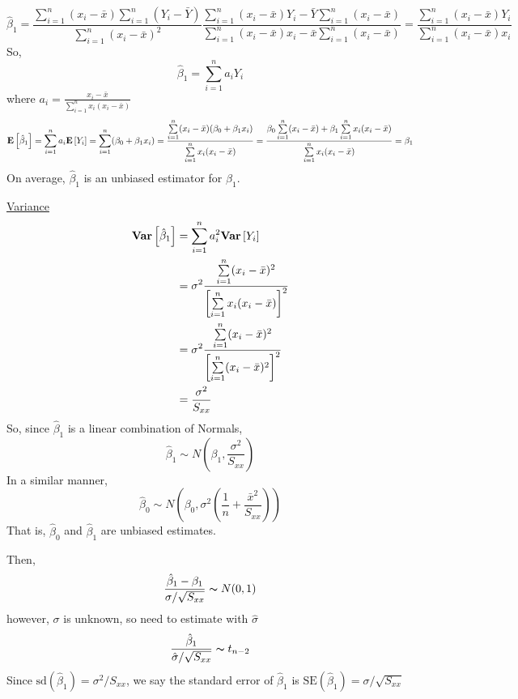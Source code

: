 \[ \hat{\beta}_1=\frac{\sum\limits_{i=1}^{n} (x_i-\bar{x})
        \sum\limits_{i=1}^{n} (Y_i-\bar{Y})}{
        \sum\limits_{i=1}^{n} (x_i-\bar{x})^2
    }
    \frac{\sum\limits_{i=1}^{n} (x_i-\bar{x})Y_i-
        \bar{Y}\sum\limits_{i=1}^{n} (x_i-\bar{x})}{
        \sum\limits_{i=1}^{n} (x_i-\bar{x})x_i-\bar{x}
        \sum\limits_{i=1}^{n} (x_i-\bar{x})
    } =
    \frac{\sum\limits_{i=1}^{n} (x_i-\bar{x})Y_i}{
        \sum\limits_{i=1}^{n} (x_i-\bar{x})x_i
    }  \]
So,
\[ \hat{\beta}_1=\sum\limits_{i=1}^{n} a_iY_i \]
where $ a_i=\frac{x_i-\bar{x}}{\sum\limits_{i=1}^{n} x_i(x_i-\bar{x})}  $
\[ \bm{\mathrm{E}}\left[\hat{\beta}_1\right]=
    \sum\limits_{i=1}^{n} a_i\bm{\mathrm{E}}\left[Y_i\right]=
    \sum\limits_{i=1}^{n}(\beta_0+\beta_1x_i)
    =\frac{\sum\limits_{i=1}^{n}(x_i-\bar{x})(\beta_0+\beta_1x_i)}{
        \sum\limits_{i=1}^{n} x_i(x_i-\bar{x})
    }
    =\frac{\beta_0 \sum\limits_{i=1}^{n}(x_i-\bar{x})+
        \beta_1\sum\limits_{i=1}^{n} x_i(x_i-\bar{x})}{
        \sum\limits_{i=1}^{n} x_i(x_i-\bar{x})
    }=
    \beta_1   \]
On average, $ \hat{\beta}_1 $ is an unbiased estimator for $ \beta_1 $.

\underline{Variance}
\begin{align*}
    \bm{\mathrm{Var}}\left[\hat{\beta}_1\right]
     & =\sum\limits_{i=1}^{n} a_i^2\bm{\mathrm{Var}}\left[Y_i\right]                   \\
     & =\sigma^2
    \frac{\sum\limits_{i=1}^{n} (x_i-\bar{x})^2}{
        \left[ \sum\limits_{i=1}^{n} x_i(x_i-\bar{x}) \right]^2
    }                                                          \\
     & =\sigma^2 \frac{\sum\limits_{i=1}^{n} (x_i-\bar{x})^2}{
        \left[ \sum\limits_{i=1}^{n} (x_i-\bar{x})^2 \right]^2
    }                                                          \\
     & =\frac{\sigma^2}{S_{xx}}
\end{align*}
So, since $ \hat{\beta}_1 $ is a linear combination of Normals,
\[ \hat{\beta}_1\sim
    N\left( \beta_1,\frac{\sigma^2}{S_{xx}}  \right) \]
In a similar manner,
\[ \hat{\beta}_0
    \sim N\left( \beta_0,\sigma^2
    \left(\frac{1}{n}+\frac{\bar{x}^2}{S_{xx}}\right)  \right) \]
That is, $ \hat{\beta}_0 $ and $ \hat{\beta}_1 $ are
unbiased estimates.

Then,
\[ \frac{\hat{\beta}_1-\beta_1}{\sigma/\sqrt{S_{xx}}} \thicksim N(0,1)  \]
however, $ \sigma $ is unknown, so need to estimate
with $ \hat{\sigma} $
\[ \frac{\hat{\beta}_1}{\hat{\sigma}/\sqrt{S_{xx}}}
    \thicksim t_{n-2}  \]
Since $ \text{sd}(\hat{\beta}_1)=\sigma^2/S_{xx} $,
we say the standard error of $ \hat{\beta}_1 $ is
$ \text{SE}(\hat{\beta}_1)=\sigma/\sqrt{S_{xx}} $

